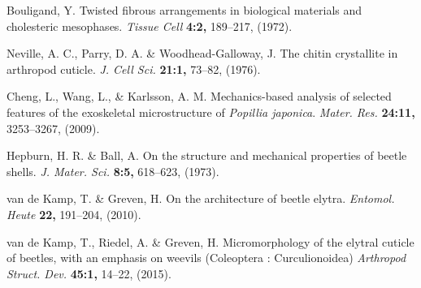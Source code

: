 \documentclass[twocolumn, linenumbers, superscriptaddress, nofootinbib]{revtex4-1}
\begin{document}
\begin{thebibliography}{50}
				Bouligand, Y.
				Twisted fibrous arrangements in biological materials and cholesteric mesophases.
				\textit{Tissue Cell}
				\textbf{4:2,}
				189--217,
				(1972).
				
				Neville, A. C., Parry, D. A. \& Woodhead-Galloway, J.
				The chitin crystallite in arthropod cuticle.
				\textit{J. Cell Sci.}
				\textbf{21:1,}
				73--82,
				(1976).
				
				Cheng, L., Wang, L., \& Karlsson, A. M.
				Mechanics-based analysis of selected features of the exoskeletal microstructure of \textit{Popillia japonica}.
				\textit{Mater. Res.}
				\textbf{24:11,}
				3253--3267,
				(2009).
				
				Hepburn, H. R. \& Ball, A.
				On the structure and mechanical properties of beetle shells.
				\textit{J. Mater. Sci.}
				\textbf{8:5,}
				618--623,
				(1973).
				
				van de Kamp, T. \& Greven, H.
				On the architecture of beetle elytra.
				\textit{Entomol. Heute}
				\textbf{22,}
				191--204,
				(2010).
			
				van de Kamp, T., Riedel, A. \& Greven, H.
				Micromorphology of the elytral cuticle of beetles, with an emphasis on weevils (Coleoptera : Curculionoidea)
				\textit{Arthropod Struct. Dev.}
				\textbf{45:1,}
				14--22,
				(2015).
			
	\end{thebibliography}

	\begin{acknowledgements}

	\end{acknowledgements}

\end{document}
